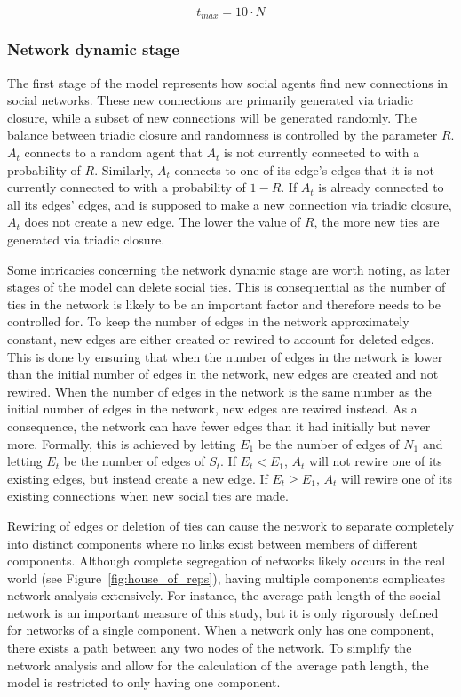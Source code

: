 \documentclass[11pt]{article}
\begin{document}
$$t_{max} = 10 \cdot N$$

\subsubsection{Network dynamic stage}
\label{network dynamic stage}
The first stage of the model represents how social agents find new connections in social networks. These new connections are primarily generated via triadic closure, while a subset of new connections will be generated randomly. The balance between triadic closure and randomness is controlled by the parameter $R$. $A_t$ connects to a random agent that $A_t$ is not currently connected to with a probability of $R$. 
Similarly, $A_t$ connects to one of its edge's edges that it is not currently connected to with a probability of $1-R$. If $A_t$ is already connected to all its edges' edges, and is supposed to make a new connection via triadic closure, $A_t$ does not create a new edge. The lower the value of $R$, the more new ties are generated via triadic closure. 

\noindent Some intricacies concerning the network dynamic stage are worth noting, as later stages of the model can delete social ties. This is consequential as the number of ties in the network is likely to be an important factor and therefore needs to be controlled for. 
To keep the number of edges in the network approximately constant, new edges are either created or rewired to account for deleted edges. 
This is done by ensuring that when the number of edges in the network is lower than the initial number of edges in the network, new edges are created and not rewired. When the number of edges in the network is the same number as the initial number of edges in the network, new edges are rewired instead. As a consequence, the network can have fewer edges than it had initially but never more. 
Formally, this is achieved by letting $E_1$ be the number of edges of $N_1$ and letting $E_t$ be the number of edges of $S_t$. 
If $E_t < E_1$, $A_t$ will not rewire one of its existing edges, but instead create a new edge. If $E_t \geq E_1$, $A_t$ will rewire one of its existing connections when new social ties are made.

\noindent Rewiring of edges or deletion of ties can cause the network to separate completely into distinct components where no links exist between members of different components. Although complete segregation of networks likely occurs in the real world (see Figure~\ref{fig:house_of_reps}), having multiple components complicates network analysis extensively. For instance, the average path length of the social network is an important measure of this study, but it is only rigorously defined for networks of a single component. When a network only has one component, there exists a path between any two nodes of the network. To simplify the network analysis and allow for the calculation of the average path length, the model is restricted to only having one component. 
\end{document}
